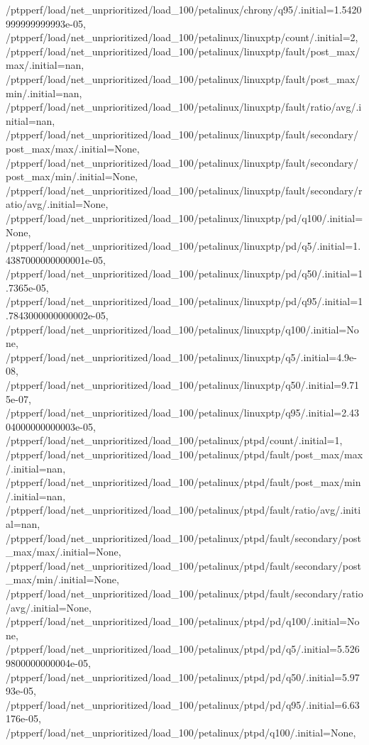 {    /ptpperf/load/net_unprioritized/load_100/petalinux/chrony/q95/.initial=1.5420999999999993e-05,
    /ptpperf/load/net_unprioritized/load_100/petalinux/linuxptp/count/.initial=2,
    /ptpperf/load/net_unprioritized/load_100/petalinux/linuxptp/fault/post_max/max/.initial=nan,
    /ptpperf/load/net_unprioritized/load_100/petalinux/linuxptp/fault/post_max/min/.initial=nan,
    /ptpperf/load/net_unprioritized/load_100/petalinux/linuxptp/fault/ratio/avg/.initial=nan,
    /ptpperf/load/net_unprioritized/load_100/petalinux/linuxptp/fault/secondary/post_max/max/.initial=None,
    /ptpperf/load/net_unprioritized/load_100/petalinux/linuxptp/fault/secondary/post_max/min/.initial=None,
    /ptpperf/load/net_unprioritized/load_100/petalinux/linuxptp/fault/secondary/ratio/avg/.initial=None,
    /ptpperf/load/net_unprioritized/load_100/petalinux/linuxptp/pd/q100/.initial=None,
    /ptpperf/load/net_unprioritized/load_100/petalinux/linuxptp/pd/q5/.initial=1.4387000000000001e-05,
    /ptpperf/load/net_unprioritized/load_100/petalinux/linuxptp/pd/q50/.initial=1.7365e-05,
    /ptpperf/load/net_unprioritized/load_100/petalinux/linuxptp/pd/q95/.initial=1.7843000000000002e-05,
    /ptpperf/load/net_unprioritized/load_100/petalinux/linuxptp/q100/.initial=None,
    /ptpperf/load/net_unprioritized/load_100/petalinux/linuxptp/q5/.initial=4.9e-08,
    /ptpperf/load/net_unprioritized/load_100/petalinux/linuxptp/q50/.initial=9.715e-07,
    /ptpperf/load/net_unprioritized/load_100/petalinux/linuxptp/q95/.initial=2.4304000000000003e-05,
    /ptpperf/load/net_unprioritized/load_100/petalinux/ptpd/count/.initial=1,
    /ptpperf/load/net_unprioritized/load_100/petalinux/ptpd/fault/post_max/max/.initial=nan,
    /ptpperf/load/net_unprioritized/load_100/petalinux/ptpd/fault/post_max/min/.initial=nan,
    /ptpperf/load/net_unprioritized/load_100/petalinux/ptpd/fault/ratio/avg/.initial=nan,
    /ptpperf/load/net_unprioritized/load_100/petalinux/ptpd/fault/secondary/post_max/max/.initial=None,
    /ptpperf/load/net_unprioritized/load_100/petalinux/ptpd/fault/secondary/post_max/min/.initial=None,
    /ptpperf/load/net_unprioritized/load_100/petalinux/ptpd/fault/secondary/ratio/avg/.initial=None,
    /ptpperf/load/net_unprioritized/load_100/petalinux/ptpd/pd/q100/.initial=None,
    /ptpperf/load/net_unprioritized/load_100/petalinux/ptpd/pd/q5/.initial=5.5269800000000004e-05,
    /ptpperf/load/net_unprioritized/load_100/petalinux/ptpd/pd/q50/.initial=5.9793e-05,
    /ptpperf/load/net_unprioritized/load_100/petalinux/ptpd/pd/q95/.initial=6.63176e-05,
    /ptpperf/load/net_unprioritized/load_100/petalinux/ptpd/q100/.initial=None,
}
